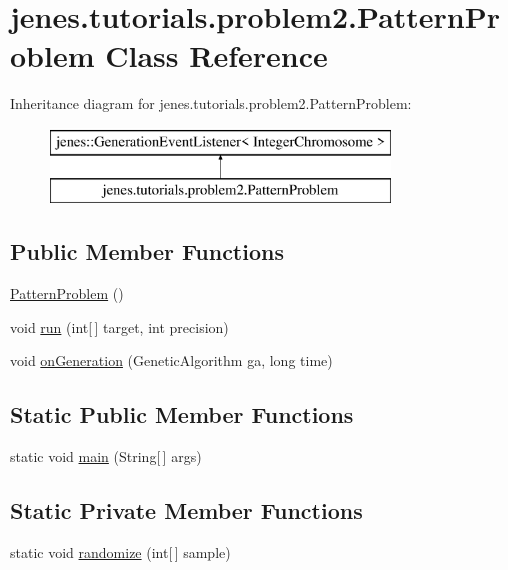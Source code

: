 \hypertarget{classjenes_1_1tutorials_1_1problem2_1_1_pattern_problem}{\section{jenes.\-tutorials.\-problem2.\-Pattern\-Problem Class Reference}
\label{classjenes_1_1tutorials_1_1problem2_1_1_pattern_problem}
}
Inheritance diagram for jenes.\-tutorials.\-problem2.\-Pattern\-Problem\-:\begin{figure}[H]
\begin{center}
\leavevmode
\includegraphics[height=2.000000cm]{classjenes_1_1tutorials_1_1problem2_1_1_pattern_problem}
\end{center}
\end{figure}
\subsection*{Public Member Functions}
\begin{DoxyCompactItemize}
\item 
\hyperlink{classjenes_1_1tutorials_1_1problem2_1_1_pattern_problem_a9ee82a524430805d9d04cfbb07d81148}{Pattern\-Problem} ()
\item 
void \hyperlink{classjenes_1_1tutorials_1_1problem2_1_1_pattern_problem_ae9d7568d540e52512e2e6ce589c624bd}{run} (int\mbox{[}$\,$\mbox{]} target, int precision)
\item 
void \hyperlink{classjenes_1_1tutorials_1_1problem2_1_1_pattern_problem_a32a0d783caa7bc42a8bb8b96ce0e4fe2}{on\-Generation} (Genetic\-Algorithm ga, long time)
\end{DoxyCompactItemize}
\subsection*{Static Public Member Functions}
\begin{DoxyCompactItemize}
\item 
static void \hyperlink{classjenes_1_1tutorials_1_1problem2_1_1_pattern_problem_a194be818fd81bffd0167012016a7035c}{main} (String\mbox{[}$\,$\mbox{]} args)
\end{DoxyCompactItemize}
\subsection*{Static Private Member Functions}
\begin{DoxyCompactItemize}
\item 
static void \hyperlink{classjenes_1_1tutorials_1_1problem2_1_1_pattern_problem_a25b4045900c218b6c106d0e108c5bce6}{randomize} (int\mbox{[}$\,$\mbox{]} sample)
\end{DoxyCompactItemize}
